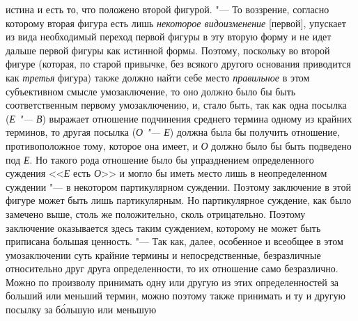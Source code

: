 {{истина и есть то, что положено второй фигурой. "--- То
воззрение, согласно которому вторая фигура есть лишь
{\em некоторое видоизменение}
[первой], упускает из вида необходимый переход первой фигуры
в эту вторую форму и не идет дальше первой фигуры как
истинной формы. Поэтому, поскольку во второй фигуре (которая, по старой
привычке, без всякого другого основания приводится как
{\em третья} фигура)
также должно найти себе место
{\em правильное} в этом
субъективном смысле умозаключение, то оно должно было бы быть
соответственным первому умозаключению, и, стало быть, так как одна посылка
({\em Е "--- В})
выражает отношение подчинения среднего термина одному из
крайних терминов, то другая посылка
({\em О "--- Е})
должна была бы получить отношение, противоположное тому,
которое она имеет, и {\em О} должно было бы быть подведено под
{\em Е}. Но такого рода
отношение было бы упразднением определенного суждения
<<{\em Е} есть {\em О}>> и могло бы иметь
место лишь в неопределенном суждении "--- в некотором
партикулярном суждении. Поэтому заключение в этой фигуре может быть лишь
партикулярным. Но партикулярное суждение, как было замечено выше, столь же
положительно, сколь отрицательно. Поэтому заключение оказывается здесь
таким суждением, которому не может быть приписана большая ценность. "---
Так как, далее, особенное и всеобщее в этом умозаключении
суть крайние термины и непосредственные, безразличные относительно друг
друга определенности, то их отношение само безразлично. Можно по произволу
принимать одну или другую из этих определенностей за больший или меньший
термин, можно поэтому также принимать и ту и другую посылку за б\'{о}льшую или
меньшую}}

